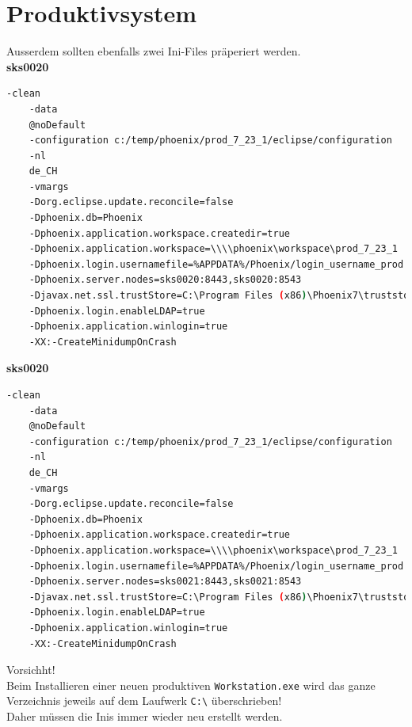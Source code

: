 
\chapter{Produktivsystem}
\begin{flushleft}
    Ausserdem sollten ebenfalls zwei Ini-Files präperiert werden.\\
    \textbf{sks0020}\\
    \lstset{style=gra_codestyle}
    \begin{lstlisting}[language=sh, caption=Workstation.ini PROD sks0020,captionpos=b,label={lst:workstation.ini-prod-sks0020},breaklines=true]
    -clean
    -data
    @noDefault
    -configuration c:/temp/phoenix/prod_7_23_1/eclipse/configuration
    -nl
    de_CH
    -vmargs
    -Dorg.eclipse.update.reconcile=false
    -Dphoenix.db=Phoenix
    -Dphoenix.application.workspace.createdir=true
    -Dphoenix.application.workspace=\\\\phoenix\workspace\prod_7_23_1
    -Dphoenix.login.usernamefile=%APPDATA%/Phoenix/login_username_prod
    -Dphoenix.server.nodes=sks0020:8443,sks0020:8543
    -Djavax.net.ssl.trustStore=C:\Program Files (x86)\Phoenix7\truststore.jks
    -Dphoenix.login.enableLDAP=true
    -Dphoenix.application.winlogin=true
    -XX:-CreateMinidumpOnCrash
    \end{lstlisting}
    \textbf{sks0020}\\
    \lstset{style=gra_codestyle}
    \begin{lstlisting}[language=sh, caption=Workstation.ini PROD sks0021,captionpos=b,label={lst:workstation.ini-prod-sks0021},breaklines=true]
    -clean
    -data
    @noDefault
    -configuration c:/temp/phoenix/prod_7_23_1/eclipse/configuration
    -nl
    de_CH
    -vmargs
    -Dorg.eclipse.update.reconcile=false
    -Dphoenix.db=Phoenix
    -Dphoenix.application.workspace.createdir=true
    -Dphoenix.application.workspace=\\\\phoenix\workspace\prod_7_23_1
    -Dphoenix.login.usernamefile=%APPDATA%/Phoenix/login_username_prod
    -Dphoenix.server.nodes=sks0021:8443,sks0021:8543
    -Djavax.net.ssl.trustStore=C:\Program Files (x86)\Phoenix7\truststore.jks
    -Dphoenix.login.enableLDAP=true
    -Dphoenix.application.winlogin=true
    -XX:-CreateMinidumpOnCrash
    \end{lstlisting}
    \begin{mdframed}
    Vorsichht!\\Beim Installieren einer neuen produktiven \texttt{Workstation.exe} wird das ganze Verzeichnis jeweils auf dem Laufwerk \texttt{C:\textbackslash} überschrieben!\\Daher müssen die Inis immer wieder neu erstellt werden.
    \end{mdframed}
\end{flushleft}
